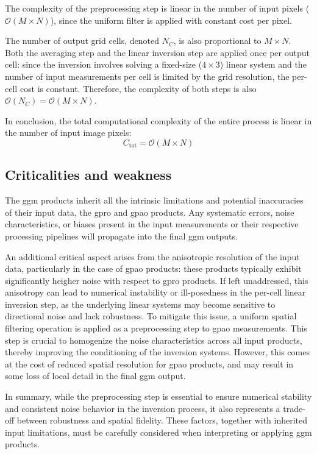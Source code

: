 The complexity of the preprocessing step is linear in the number of input pixels (\( \mathcal{O}(M \times N) \)), since the uniform filter is applied with constant cost per pixel.

The number of output grid cells, denoted \( N_C \), is also proportional to \( M \times N \). Both the averaging step and the linear inversion step are applied once per output cell: since the inversion involves solving a fixed-size (\( 4 \times 3 \)) linear system and the number of input measurements per cell is limited by the grid resolution, the per-cell cost is constant. Therefore, the complexity of both steps is also \( \mathcal{O}(N_C) = \mathcal{O}(M \times N) \).

In conclusion, the total computational complexity of the entire process is linear in the number of input image pixels:
\[
C_{\text{tot}} = \mathcal{O}(M \times N)
\]

\subsection{Criticalities and weakness}
\label{sec:ggm_criticalities}

The \acs{ggm} products inherit all the intrinsic limitations and potential inaccuracies of their input data, the \acs{gpro} and \acs{gpao} products. Any systematic errors, noise characteristics, or biases present in the input measurements or their respective processing pipelines will propagate into the final \acs{ggm} outputs.

An additional critical aspect arises from the anisotropic resolution of the input data, particularly in the case of \acs{gpao} products: these products typically exhibit significantly heigher noise with respect to \acs{gpro} products. If left unaddressed, this anisotropy can lead to numerical instability or ill-posedness in the per-cell linear inversion step, as the underlying linear systems may become sensitive to directional noise and lack robustness. To mitigate this issue, a uniform spatial filtering operation is applied as a preprocessing step to \acs{gpao} measurements. This step is crucial to homogenize the noise characteristics across all input products, thereby improving the conditioning of the inversion systems. However, this comes at the cost of reduced spatial resolution for \acs{gpao} products, and may result in some loss of local detail in the final \acs{ggm} output.

In summary, while the preprocessing step is essential to ensure numerical stability and consistent noise behavior in the inversion process, it also represents a trade-off between robustness and spatial fidelity. These factors, together with inherited input limitations, must be carefully considered when interpreting or applying \acs{ggm} products.

